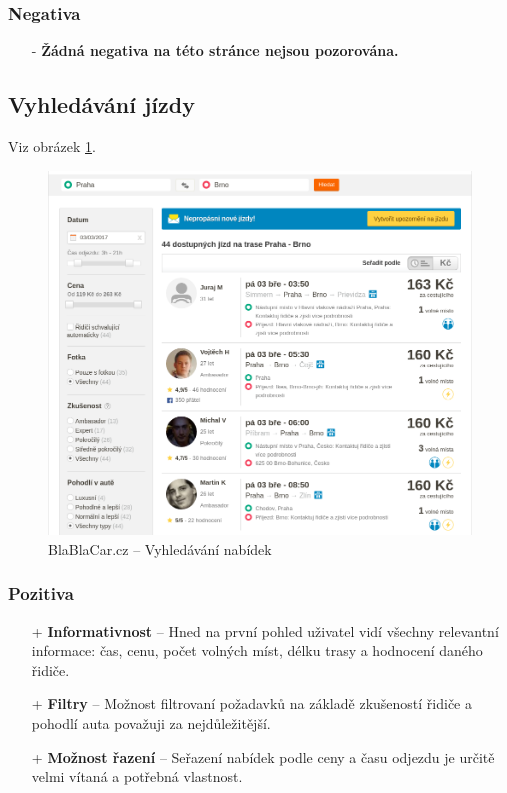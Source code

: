 \subsubsection*{Negativa}
\begin{itemize}
    \item[-] \textbf{Žádná negativa na této stránce nejsou pozorována.}
\end{itemize}



\newpage
\subsection{Vyhledávání jízdy}
Viz obrázek \ref{fig:blablacar:search}.
\begin{figure}[h]
    \centering
    \includegraphics[width=1.0\textwidth]{media/blablacar/search.png}
    \caption{BlaBlaCar.cz -- Vyhledávání nabídek}
    \label{fig:blablacar:search}
\end{figure}
\subsubsection*{Pozitiva}
\begin{itemize}
    \item[+] \textbf{Informativnost} -- Hned na první pohled uživatel vidí všechny relevantní informace: čas, cenu, počet volných míst, délku trasy a hodnocení daného řidiče.
    \item[+] \textbf{Filtry} -- Možnost filtrovaní požadavků na základě zkušeností řidiče a pohodlí auta považuji za nejdůležitější.
    \item[+] \textbf{Možnost řazení} -- Seřazení nabídek podle ceny a času odjezdu je určitě velmi vítaná a potřebná vlastnost.
\end{itemize}
